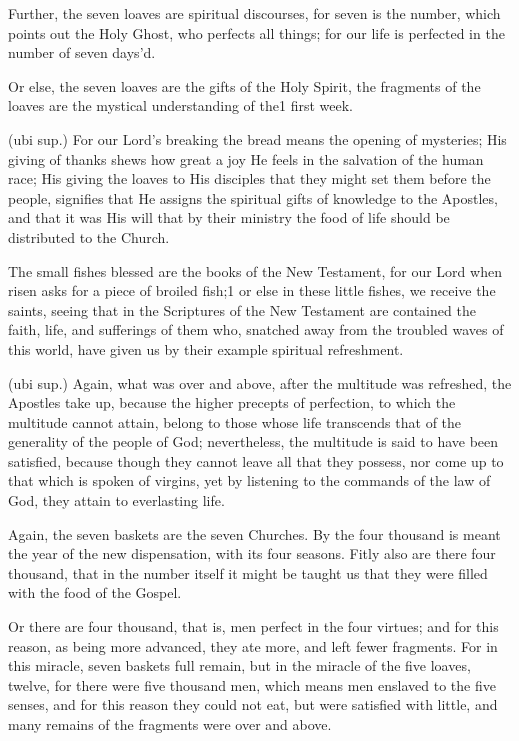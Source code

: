  Further, the seven loaves are spiritual discourses, for seven is the number, which points out the Holy Ghost, who perfects all things; for our life is perfected in the number of seven days’d.

 Or else, the seven loaves are the gifts of the Holy Spirit, the fragments of the loaves are the mystical understanding of the1 first week.

 (ubi sup.) For our Lord’s breaking the bread means the opening of mysteries; His giving of thanks shews how great a joy He feels in the salvation of the human race; His giving the loaves to His disciples that they might set them before the people, signifies that He assigns the spiritual gifts of knowledge to the Apostles, and that it was His will that by their ministry the food of life should be distributed to the Church.

 The small fishes blessed are the books of the New Testament, for our Lord when risen asks for a piece of broiled fish;1 or else in these little fishes, we receive the saints, seeing that in the Scriptures of the New Testament are contained the faith, life, and sufferings of them who, snatched away from the troubled waves of this world, have given us by their example spiritual refreshment.

 (ubi sup.) Again, what was over and above, after the multitude was refreshed, the Apostles take up, because the higher precepts of perfection, to which the multitude cannot attain, belong to those whose life transcends that of the generality of the people of God; nevertheless, the multitude is said to have been satisfied, because though they cannot leave all that they possess, nor come up to that which is spoken of virgins, yet by listening to the commands of the law of God, they attain to everlasting life.

 Again, the seven baskets are the seven Churches. By the four thousand is meant the year of the new dispensation, with its four seasons. Fitly also are there four thousand, that in the number itself it might be taught us that they were filled with the food of the Gospel.

 Or there are four thousand, that is, men perfect in the four virtues; and for this reason, as being more advanced, they ate more, and left fewer fragments. For in this miracle, seven baskets full remain, but in the miracle of the five loaves, twelve, for there were five thousand men, which means men enslaved to the five senses, and for this reason they could not eat, but were satisfied with little, and many remains of the fragments were over and above.

